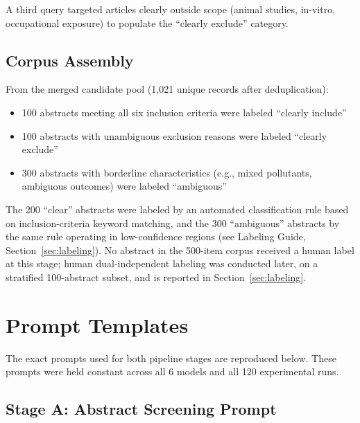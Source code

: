 \documentclass[11pt]{article}
\begin{document}
A third query targeted articles clearly outside scope (animal studies, in-vitro, occupational exposure) to populate the ``clearly exclude'' category.

\subsection{Corpus Assembly}

From the merged candidate pool (1,021 unique records after deduplication):
\begin{itemize}
  \item 100 abstracts meeting all six inclusion criteria were labeled ``clearly include''
  \item 100 abstracts with unambiguous exclusion reasons were labeled ``clearly exclude''
  \item 300 abstracts with borderline characteristics (e.g., mixed pollutants, ambiguous outcomes) were labeled ``ambiguous''
\end{itemize}

The 200 ``clear'' abstracts were labeled by an automated classification rule based on inclusion-criteria keyword matching, and the 300 ``ambiguous'' abstracts by the same rule operating in low-confidence regions (see Labeling Guide, Section~\ref{sec:labeling}).
No abstract in the 500-item corpus received a human label at this stage; human dual-independent labeling was conducted later, on a stratified 100-abstract subset, and is reported in Section~\ref{sec:labeling}.

\section{Prompt Templates}
\label{sec:prompts}

The exact prompts used for both pipeline stages are reproduced below.
These prompts were held constant across all 6 models and all 120 experimental runs.

\subsection{Stage A: Abstract Screening Prompt}
\end{document}
